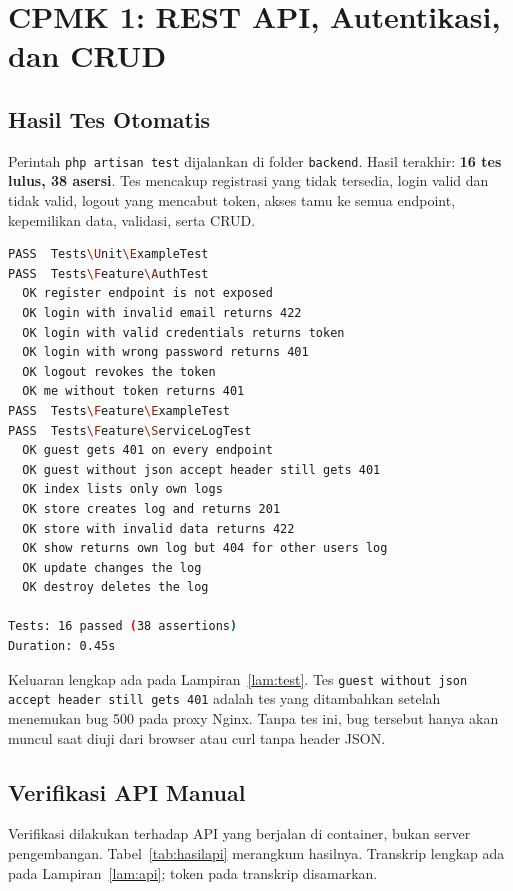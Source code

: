 \documentclass[12pt,a4paper,oneside]{book}
\begin{document}
\section{CPMK 1: REST API, Autentikasi, dan CRUD}

\subsection{Hasil Tes Otomatis}

Perintah \texttt{php artisan test} dijalankan di folder \texttt{backend}. Hasil
terakhir: \textbf{16 tes lulus, 38 asersi}. Tes mencakup registrasi yang tidak
tersedia, login valid dan tidak valid, logout yang mencabut token, akses tamu ke
semua endpoint, kepemilikan data, validasi, serta CRUD.

\begin{lstlisting}[language=bash,caption={Keluaran \texttt{php artisan test} (ringkas)},label={kode:test}]
PASS  Tests\Unit\ExampleTest
PASS  Tests\Feature\AuthTest
  OK register endpoint is not exposed
  OK login with invalid email returns 422
  OK login with valid credentials returns token
  OK login with wrong password returns 401
  OK logout revokes the token
  OK me without token returns 401
PASS  Tests\Feature\ExampleTest
PASS  Tests\Feature\ServiceLogTest
  OK guest gets 401 on every endpoint
  OK guest without json accept header still gets 401
  OK index lists only own logs
  OK store creates log and returns 201
  OK store with invalid data returns 422
  OK show returns own log but 404 for other users log
  OK update changes the log
  OK destroy deletes the log

Tests: 16 passed (38 assertions)
Duration: 0.45s
\end{lstlisting}

Keluaran lengkap ada pada Lampiran~\ref{lam:test}. Tes
\texttt{guest without json accept header still gets 401} adalah tes yang ditambahkan
setelah menemukan bug 500 pada proxy Nginx. Tanpa tes ini, bug tersebut hanya akan
muncul saat diuji dari browser atau curl tanpa header JSON.

\subsection{Verifikasi API Manual}

Verifikasi dilakukan terhadap API yang berjalan di container, bukan server
pengembangan. Tabel~\ref{tab:hasilapi} merangkum hasilnya. Transkrip lengkap ada
pada Lampiran~\ref{lam:api}; token pada transkrip disamarkan.
\end{document}
